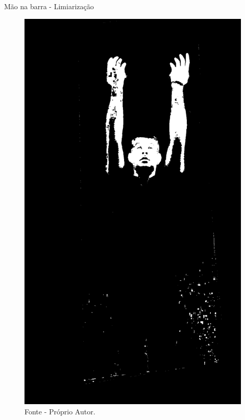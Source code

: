 \begin{frame}{Mão na barra - Limiarização}
    \begin{figure}[!ht]
    \centering
    \includegraphics[scale=0.1]{img/desenvolvimento/maoBarra/limited.png}
    \caption*{Fonte - Próprio Autor.}
    \end{figure}
\end{frame}


